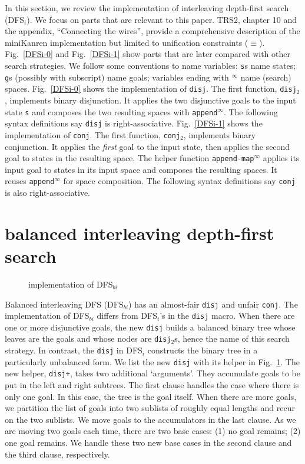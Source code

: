 \documentclass[format=acmlarge, review=true, authordraft=true]{acmart}
\newcommand{\conj}{\texttt{conj}}
\newcommand{\disj}{\texttt{disj}}
\newcommand{\disjtwo}{\texttt{disj$_2$}}
\newcommand{\conjtwo}{\texttt{conj$_2$}}
\newcommand{\appendInf}{\texttt{append$^\infty$}}
\newcommand{\appendMapInf}{\texttt{append-map$^\infty$}}
\newcommand{\DFSi }[0]{DFS$_{i}$}
\newcommand{\DFSbi}[0]{DFS$_{bi}$}
\begin{document}
In this section, we review the implementation of interleaving depth-first 
search (\DFSi). We focus on parts that are relevant to this paper. TRS2,
chapter 10 and the appendix, ``Connecting the wires'', 
provide a comprehensive description of the miniKanren 
implementation but limited to unification constraints ($\equiv$).
Fig.~\ref{DFSi-0} and Fig.~\ref{DFSi-1} show parts that are later compared 
with other search strategies. We follow some conventions to name variables: 
\texttt{s}s name states; \texttt{g}s (possibly with subscript) name goals; 
variables ending with $^\infty$ name (search) spaces. Fig.~\ref{DFSi-0} shows 
the 
implementation of \disj. The 
first function, \disjtwo, implements binary disjunction. It applies the 
two disjunctive goals to the input state \texttt{s} and composes the two 
resulting spaces with \appendInf{}. The following syntax 
definitions say \disj{} is right-associative. Fig.~\ref{DFSi-1} 
shows the implementation of \conj. The first function, \conjtwo{}, 
implements binary conjunction. 
It applies the \emph{first} goal to the input state, then applies the second 
goal to states in the resulting space. The helper function 
\appendMapInf{} applies its input goal to states 
in its input space and composes the resulting spaces. It reuses 
\appendInf{} for space composition. The following syntax 
definitions say \conj{} is also right-associative.

\section{balanced interleaving depth-first search}

\begin{figure}
	
	\caption{implementation of \DFSbi{}}
	\label{balanced-disj}
\end{figure}

Balanced interleaving DFS (\DFSbi{}) has an almost-fair \disj{} and unfair 
\conj{}. The implementation of \DFSbi{} differs from 
\DFSi{}'s in the \disj{} macro. When there are one or more disjunctive 
goals, the new \disj{} builds a balanced binary tree whose leaves are the goals 
and 
whose nodes are \disjtwo{}s, hence the name of this search strategy. 
In contrast, the \disj{} in \DFSi{} constructs the binary tree in a 
particularly unbalanced form.
We list the new \disj{} with its helper in Fig.~\ref{balanced-disj}.
The new helper, \texttt{disj+}, takes two additional `arguments'. They 
accumulate goals to be put in the left and right subtrees. The first clause 
handles the case where there is only one goal. In this case, the tree is the 
goal itself. When there are more goals, we partition the list of goals 
into two sublists of roughly equal lengths and recur on the two sublists. We 
move goals to the accumulators in the last clause. As we are moving 
two goals each time, there are two base cases: (1) no goal remains; (2) one 
goal remains. We handle these two new base cases in the second clause and the 
third clause, respectively. 
\end{document}
